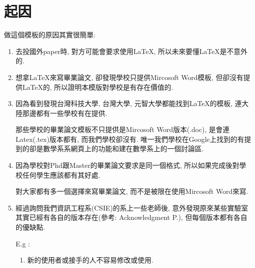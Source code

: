
\section{起因}

做這個模板的原因其實很簡單:

\begin{enumerate}
  \item
  {
    去投國外paper時, 對方可能會要求使用LaTeX, 所以未來要懂LaTeX是不意外的.
  } %

  \item
  {
    想拿LaTeX來寫畢業論文, 卻發現學校只提供Mircosoft Word模板, 但卻沒有提供LaTeX的, 所以證明本模版對學校是有存在價值的.
  } %

  \item
  {
    因為看到發現台灣科技大學\cite{web:latex:template:ntust}, 台灣大學\cite{web:latex:template:ntu}, 元智大學\cite{web:latex:template:ntust}都能找到LaTeX的模板, 連大陸那邊都有一些學校有在提供.

    那些學校的畢業論文模板不只提供是Mircosoft Word版本(.doc), 是會連Latex(.tex)版本都有, 而我們學校卻沒有. 唯一我們學校在Google上找到的有提到的卻是數學系系網頁上的功能\cite{web:latex:ncku_math_introduction}和建在數學系上的一個討論區\cite{web:latex:ncku_math_forum}.
  } %

  \item
  {
    因為學校對Phd跟Master的畢業論文要求是同一個格式, 所以如果完成後對學校任何學生應該都有其好處.

    對大家都有多一個選擇來寫畢業論文, 而不是被限在使用Mircosoft Word來寫.
  } %

  \item
  {
    經過詢問我們資訊工程系(CSIE)的系上一些老師後, 意外發現原來某些實驗室其實已經有各自的版本存在(參考: Acknowledgment P.\pageref{acknowledgments-chi}), 但每個版本都有各自的優缺點.

    E.g :
    \begin{enumerate}

      \item
      {
        新的使用者或接手的人不容易修改或使用.
      } %


\end{enumerate}}
\end{enumerate}
